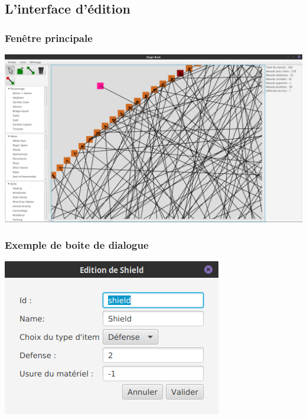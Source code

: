 \documentclass[beamer]{BetterDocument}
\begin{document}
	\subsection{L'interface d'édition}
	\begin{frame}
		\frametitle{Fenêtre principale}

		\center\includegraphics[width=0.8\paperwidth, keepaspectratio]{img/editeur.png}
	\end{frame}

	\begin{frame}
		\frametitle{Exemple de boite de dialogue}

		\center\includegraphics[width=0.4\paperwidth, keepaspectratio]{img/editeur_item.png}
	\end{frame}
\end{document}
